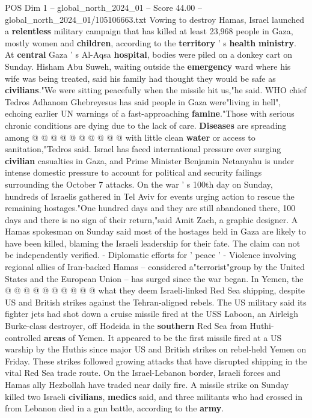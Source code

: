 \begin{textsample}{POS Dim 1 – global\_north\_2024\_01 – Score 44.00 – global\_north\_2024\_01/105106663.txt}
Vowing to destroy Hamas, Israel launched a \textbf{relentless} military campaign that has killed at least 23,968 people in Gaza, mostly women and \textbf{children}, according to the \textbf{territory} ' s \textbf{health} \textbf{ministry}.
At \textbf{central} Gaza ' s Al-Aqsa \textbf{hospital}, bodies were piled on a donkey cart on Sunday.
Hisham Abu Suweh, waiting outside the \textbf{emergency} ward where his wife was being treated, said his family had thought they would be safe as \textbf{civilians}."We were sitting peacefully when the missile hit us,"he said.
WHO chief Tedros Adhanom Ghebreyesus has said people in Gaza were"living in hell", echoing earlier UN warnings of a fast-approaching \textbf{famine}."Those with serious chronic conditions are dying due to the lack of care. \textbf{Diseases} are spreading among @ @ @ @ @ @ @ @ @ @ with little clean \textbf{water} or access to sanitation,"Tedros said.
Israel has faced international pressure over surging \textbf{civilian} casualties in Gaza, and Prime Minister Benjamin Netanyahu is under intense domestic pressure to account for political and security failings surrounding the October 7 attacks.
On the war ' s 100th day on Sunday, hundreds of Israelis gathered in Tel Aviv for events urging action to rescue the remaining hostages."One hundred days and they are still abandoned there, 100 days and there is no sign of their return,"said Amit Zach, a graphic designer.
A Hamas spokesman on Sunday said most of the hostages held in Gaza are likely to have been killed, blaming the Israeli leadership for their fate.
The claim can not be independently verified. - Diplomatic efforts for ' peace ' - Violence involving regional allies of Iran-backed Hamas -- considered a"terrorist"group by the United States and the European Union -- has surged since the war began.
In Yemen, the @ @ @ @ @ @ @ @ @ @ what they deem Israeli-linked Red Sea shipping, despite US and British strikes against the Tehran-aligned rebels.
The US military said its fighter jets had shot down a cruise missile fired at the USS Laboon, an Airleigh Burke-class destroyer, off Hodeida in the \textbf{southern} Red Sea from Huthi-controlled \textbf{areas} of Yemen.
It appeared to be the first missile fired at a US warship by the Huthis since major US and British strikes on rebel-held Yemen on Friday.
These strikes followed growing attacks that have disrupted shipping in the vital Red Sea trade route.
On the Israel-Lebanon border, Israeli forces and Hamas ally Hezbollah have traded near daily fire.
A missile strike on Sunday killed two Israeli \textbf{civilians}, \textbf{medics} said, and three militants who had crossed in from Lebanon died in a gun battle, according to the \textbf{army}.

\end{textsample}
